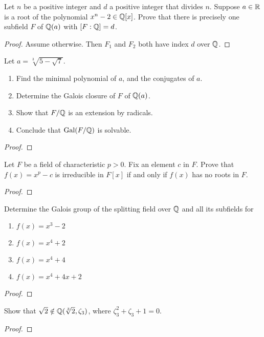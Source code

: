 \begin{problem}
  Let $n$ be a positive integer and $d$ a positive integer that
  divides $n$. Suppose $a\in\mathbb{R}$ is a root of the polynomial
  $x^n-2\in\mathbb{Q}[x]$. Prove that there is precisely one subfield
  $F$ of $\mathbb{Q}(a)$ with $[F:\mathbb{Q}]=d$.
\begin{proof}
  Assume otherwise. Then $F_1$ and $F_2$ both have index $d$ over
  $\mathbb{Q}$.
\end{proof}
\end{problem}

\begin{problem}
  Let $a=\sqrt[3]{5-\sqrt{7}}$.
  \begin{enumerate}[label=(\alph*)]
  \item Find the minimal polynomial of $a$, and the conjugates of
    $a$.
  \item Determine the Galois closure of $F$ of $\mathbb{Q}(a)$.
  \item Show that $F/\mathbb{Q}$ is an extension by radicals.
  \item Conclude that $\operatorname{Gal}(F/\mathbb{Q})$ is solvable.
  \end{enumerate}
\begin{proof}
\end{proof}
\end{problem}

\begin{problem}
  Let $F$ be a field of characteristic $p>0$. Fix an element $c$
  in $F$. Prove that $f(x)=x^p-c$ is irreducible in $F[x]$ if and
  only if $f(x)$ has no roots in $F$.
\begin{proof}
\end{proof}
\end{problem}

\begin{problem}
  Determine the Galois group of the splitting field over $\mathbb{Q}$
  and all its subfields for
  \begin{enumerate}[label=(\alph*)]
  \item $f(x)=x^3-2$
  \item $f(x)=x^4+2$
  \item $f(x)=x^4+4$
  \item $f(x)=x^4+4x+2$
  \end{enumerate}
\begin{proof}
\end{proof}
\end{problem}

\begin{problem}
  Show that $\sqrt{2}\notin\mathbb{Q}(\sqrt[3]{2},\zeta_3)$, where
  $\zeta_3^2+\zeta_3+1=0$.
\begin{proof}
\end{proof}
\end{problem}

